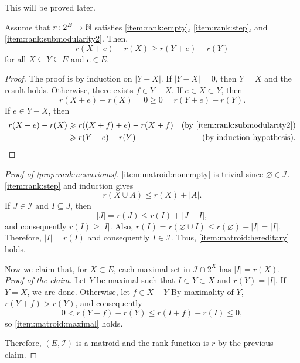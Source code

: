 This will be proved later.

\begin{lemma} \label{lemma:diminishing}
    Assume that \(r \colon 2^E \to \nonnegatives\) satisfies \ref{item:rank:empty}, \ref{item:rank:step}, and \ref{item:rank:submodularity2}.
    Then,
    \begin{equation}
        r(X + e) - r(X) \geq r(Y + e) - r(Y)
    \end{equation}
    for all \(X \subseteq Y \subseteq E\) and \(e \in E\).
\end{lemma}

\begin{proof}
    The proof is by induction on \(|Y - X|\).
    If \(|Y - X| = 0\), then \(Y = X\) and the result holds.
    Otherwise, there exists \(f \in Y - X\).
    If \(e \in X \subset Y\), then 
    \begin{equation}
        r(X + e) - r(X) = 0 \geq 0 = r(Y + e) - r(Y).
    \end{equation}
    If \(e \in Y - X\), then
    \begin{align*}
        r(X + e) - r(X)
        &\geq r((X+f)+e) - r(X + f) & \text{(by \ref{item:rank:submodularity2})} \\
        &\geq r(Y + e) - r(Y) & \text{(by induction hypothesis)}.
    \end{align*}
\end{proof}

\begin{proof}[Proof of \ref{prop:rank:newaxioms}]
    \ref{item:matroid:nonempty} is trivial since \(\varnothing \in \mathcal{I}\).
    \ref{item:rank:step} and induction gives 
    \begin{equation}
        r(X \cup A) \leq r(X) + |A|.
    \end{equation}
    If \(J \in \mathcal{I}\) and \(I \subseteq J\), then
    \begin{equation}
        |J| = r(J) \leq r(I) + |J - I|,
    \end{equation}
    and consequently \(r(I) \geq |I|\).
    Also, \(r(I) = r(\varnothing \cup I) \leq r(\varnothing) + |I| = |I|\).
    Therefore, \(|I| = r(I)\) and consequently \(I \in \mathcal{I}\).
    Thus, \ref{item:matroid:hereditary} holds.

    Now we claim that, for \(X \subset E\), each maximal set in \(\mathcal{I} \cap 2^X\) has \(|I| = r(X)\).
    \textit{Proof of the claim.}
    Let \(Y\) be maximal such that \(I \subset Y \subset X\) and \(r(Y) = |I|\).
    If \(Y = X\), we are done.
    Otherwise, let \(f \in  X - Y\)
    By maximality of \(Y\), \(r(Y + f) > r(Y)\), and consequently
    \begin{equation}
        0 < r(Y + f) - r(Y) \leq r(I + f) - r(I) \leq 0,
    \end{equation}
    so \ref{item:matroid:maximal} holds.

    Therefore, \((E, \mathcal{I})\) is a matroid and the rank function is \(r\) by the previous claim.
\end{proof}

